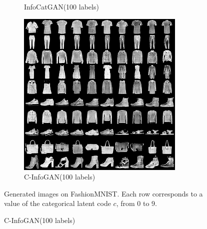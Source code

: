 \begin{figure}[hbtp]
\begin{subfigure}[b]{\trif\textwidth}
    \caption{InfoCatGAN(100 labels)}
    \label{ffig:ss-icg}
  \end{subfigure}
  \begin{subfigure}[b]{\trif\textwidth}
    \includegraphics[width=\textwidth]{Img/fa-cig-100labels-new.png}
    \caption{C-InfoGAN(100 labels)}
    \label{ffig:ss-ig}
  \end{subfigure}

  {Generated images on FashionMNIST. Each row corresponds to a value of the categorical latent code $c$, from 0 to 9.}
  \label{fig:fashion}
\end{figure}
